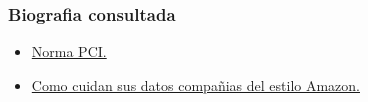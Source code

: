 \subsubsection{Biografia consultada}
\begin{itemize}
\item \href{https://www.pcisecuritystandards.org/documents/Tokenization_Guidelines_Info_Supplement.pdf}{Norma PCI.}\\
\item \href{https://www.quora.com/Do-companies-like-Amazon-etc-have-a-server-farm-to-store-creditcard-information-on-database}{Como cuidan sus datos compañias del estilo Amazon.}
\end{itemize}
